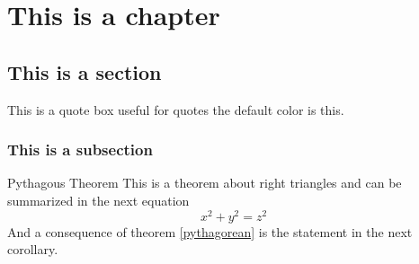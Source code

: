 \documentclass[letterpaper,10pt,twoside,onecolumn,openany]{book}
\begin{document}
\tableofcontents

\chapter{This is a chapter}

\section{This is a section}
\lipsum[1]
\begin{quotebox}
    This is a quote box useful for quotes the default color is this.
\end{quotebox}
\lipsum[11]
\subsection{This is a subsection}
\begin{Theorem}{Pythagous Theorem}
\label{pythagorean}
This is a theorem about right triangles and can be summarized in the next equation 
\[ x^2 + y^2 = z^2 \]
And a consequence of theorem \ref{pythagorean} is the statement in the next corollary.
\end{Theorem}
\lipsum[5]
\begin{Note}
    \lipsum[4]
    \lipsum[6]
\end{Note}
\end{document}

